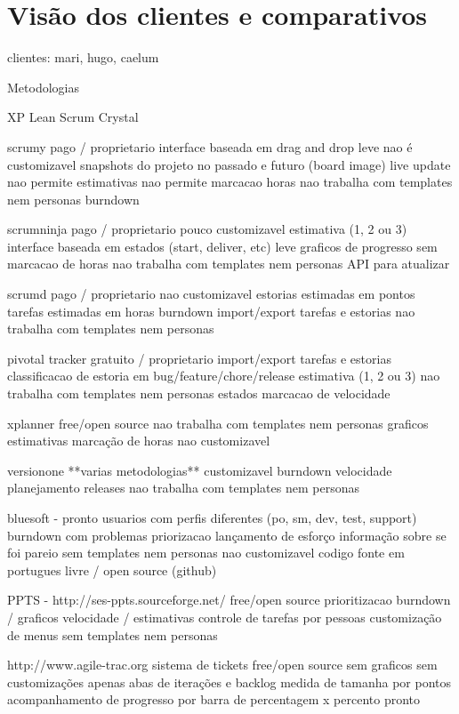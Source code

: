 \section{Visão dos clientes e comparativos}

clientes: mari, hugo, caelum

Metodologias

XP
Lean
Scrum
Crystal


scrumy
	pago / proprietario
	interface baseada em drag and drop
	leve
	nao é customizavel
	snapshots do projeto no passado e futuro (board image)
	live update
	nao permite estimativas
	nao permite marcacao horas
	nao trabalha com templates nem personas
	burndown
	
scrumninja
	pago / proprietario
	pouco customizavel
	estimativa (1, 2 ou 3)
	interface baseada em estados (start, deliver, etc)
	leve
	graficos de progresso
	sem marcacao de horas
	nao trabalha com templates nem personas
	API para atualizar 

scrumd
  pago / proprietario
  nao customizavel
  estorias estimadas em pontos
  tarefas estimadas em horas
  burndown
	import/export tarefas e estorias
	nao trabalha com templates nem personas

pivotal tracker
	gratuito / proprietario
	import/export tarefas e estorias
	classificacao de estoria em bug/feature/chore/release
	estimativa (1, 2 ou 3)
	nao trabalha com templates nem personas
	estados
	marcacao de velocidade
	
xplanner
	free/open source
	nao trabalha com templates nem personas
	graficos
	estimativas
	marcação de horas
	nao customizavel
	
versionone
	**varias metodologias**
	customizavel
	burndown
	velocidade
	planejamento releases
	nao trabalha com templates nem personas

bluesoft - pronto
	usuarios com perfis diferentes (po, sm, dev, test, support)
	burndown com problemas
	priorizacao
	lançamento de esforço
	informação sobre se foi pareio
	sem templates nem personas
	nao customizavel
	codigo fonte em portugues
	livre / open source (github)

PPTS - http://ses-ppts.sourceforge.net/
	free/open source
	prioritizacao
	burndown / graficos
	velocidade / estimativas
	controle de tarefas por pessoas
	customização de menus
	sem templates nem personas

http://www.agile-trac.org
	sistema de tickets
	free/open source
	sem graficos
	sem customizações
	apenas abas de iterações e backlog
	medida de tamanha por pontos
	acompanhamento de progresso por barra de percentagem x percento pronto

